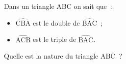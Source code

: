 \documentclass[exercice]{thedocument}%
\begin{document}
%
Dans un triangle ABC on sait que~:
\begin{itemize}
\item $\widehat{\text{CBA}}$ est le double de $\widehat{\text{BAC}}$~;
\item $\widehat{\text{ACB}}$ est le triple de $\widehat{\text{BAC}}$.
\end{itemize}
Quelle est la nature du triangle ABC~?
\end{document}
